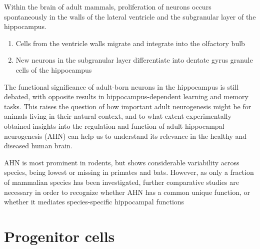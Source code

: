 % 
% 
% 
% 

Within the brain of adult mammals, proliferation of neurons occurs spontaneously
in the walls of the lateral ventricle and the subgranular layer of the
hippocampus.
\begin{enumerate}
  \item Cells from the ventricle walls migrate and integrate into the olfactory
  bulb
  
  \item New neurons in the subgranular layer differentiate into dentate gyrus
  granule cells of the hippocampus 
\end{enumerate}

The functional significance of adult-born neurons in the hippocampus is still
debated, with opposite results in  hippocampus-dependent learning and memory
tasks.  This raises the question of how important adult neurogenesis might be
for animals living in their natural context, and to what extent experimentally
obtained insights into the regulation and function of adult hippocampal
neurogenesis (AHN) can help us to understand its relevance in the healthy and
diseased human brain.

AHN is most prominent in rodents, but shows considerable variability across
species, being lowest or missing in primates and bats.
However, as only a fraction of mammalian species has been investigated, further
comparative studies are necessary in order to recognize whether AHN has a common
unique function, or whether it mediates species-specific hippocampal functions
\citep{amrein2009}


\section{Progenitor cells}
\label{sec:progenitor-cell}



